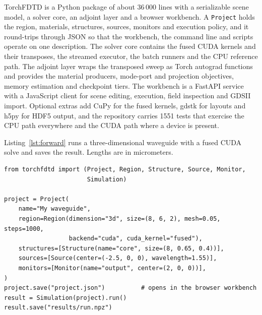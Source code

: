 \documentclass[preprint,11pt]{elsarticle}
\newcommand{\code}[1]{{\small\nolinkurl{#1}}}
\begin{document}
TorchFDTD is a Python package of about 36\,000 lines with a serializable scene model, a solver core, an adjoint layer and a browser workbench. A \code{Project} holds the region, materials, structures, sources, monitors and execution policy, and it round-trips through JSON so that the workbench, the command line and scripts operate on one description. The solver core contains the fused CUDA kernels and their transposes, the streamed executor, the batch runners and the CPU reference path. The adjoint layer wraps the transposed sweep as Torch autograd functions and provides the material producers, mode-port and projection objectives, memory estimation and checkpoint tiers. The workbench is a FastAPI service with a JavaScript client for scene editing, execution, field inspection and GDSII import. Optional extras add CuPy for the fused kernels, gdstk for layouts and h5py for HDF5 output, and the repository carries 1551 tests that exercise the CPU path everywhere and the CUDA path where a device is present.

Listing~\ref{lst:forward} runs a three-dimensional waveguide with a fused CUDA solve and saves the result. Lengths are in micrometers.
\begin{lstlisting}[float=tbp,caption={A forward simulation with the fused CUDA path.},label={lst:forward}]
from torchfdtd import (Project, Region, Structure, Source, Monitor,
                       Simulation)

project = Project(
    name="My waveguide",
    region=Region(dimension="3d", size=(8, 6, 2), mesh=0.05, steps=1000,
                  backend="cuda", cuda_kernel="fused"),
    structures=[Structure(name="core", size=(8, 0.65, 0.4))],
    sources=[Source(center=(-2.5, 0, 0), wavelength=1.55)],
    monitors=[Monitor(name="output", center=(2, 0, 0))],
)
project.save("project.json")          # opens in the browser workbench
result = Simulation(project).run()
result.save("results/run.npz")
\end{lstlisting}
\end{document}
